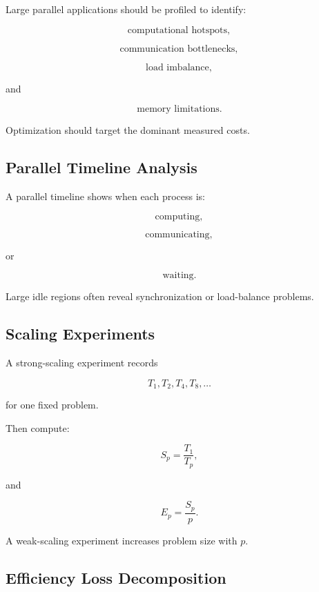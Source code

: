 Large parallel applications should be profiled to identify:

\[
\boxed{
\text{computational hotspots},
}
\]

\[
\boxed{
\text{communication bottlenecks},
}
\]

\[
\boxed{
\text{load imbalance},
}
\]

and

\[
\boxed{
\text{memory limitations}.
}
\]

Optimization should target the dominant measured costs.

\subsection{Parallel Timeline Analysis}
\label{subsec:parallel-timeline-analysis}

A parallel timeline shows when each process is:

\[
\boxed{
\text{computing},
}
\]

\[
\boxed{
\text{communicating},
}
\]

or

\[
\boxed{
\text{waiting}.
}
\]

Large idle regions often reveal synchronization or load-balance problems.

\subsection{Scaling Experiments}
\label{subsec:hpmc-scaling-experiments}

A strong-scaling experiment records

\[
T_1,T_2,T_4,T_8,\ldots
\]

for one fixed problem.

Then compute:

\[
\boxed{
S_p
=
\frac{T_1}{T_p},
}
\]

and

\[
\boxed{
E_p
=
\frac{S_p}{p}.
}
\]

A weak-scaling experiment increases problem size with \(p\).

\subsection{Efficiency Loss Decomposition}
\label{subsec:efficiency-loss-decomposition}


